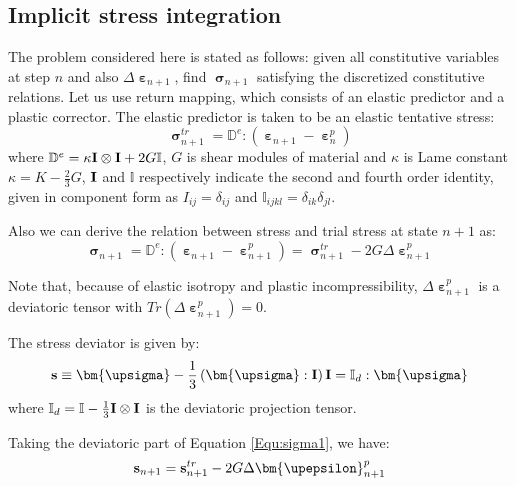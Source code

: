 \subsection{Implicit stress integration}
The problem considered here is stated as follows: given all constitutive variables at step $n$ and also $\Delta {{\bm{\upepsilon }}_{n + 1}}$, find $\bm{\upsigma}_{n+1}$  satisfying the discretized constitutive relations. Let us use return mapping, which consists of an elastic predictor and a plastic corrector. The elastic predictor is taken to be an elastic tentative stress:
\begin{equation}
{\bm{\upsigma }}_{n + 1}^{tr} = {\mathbb{D}^e}:\left( {{{\bm{\upepsilon }}_{n + 1}} - {\bm{\upepsilon }}_n^p} \right)
\end{equation}
where ${\mathbb{D}^e} = \kappa {\bf{I}} \otimes {\bf{I}} + 2G\mathbb{I}$, $G$ is shear modules of material and $\kappa$ is Lame constant $\kappa  = K - \frac{2}{3}G$, ${\bf{I}}$ and $\mathbb{I}$ respectively indicate the second and fourth order identity, given in component form as ${I_{ij}} = {\delta _{ij}}$ and ${\mathbb{I}_{ijkl}} = {\delta _{ik}}{\delta _{jl}}$.

Also we can derive the relation between stress and trial stress at state $n+1$ as:
\begin{equation}
\label{Equ:sigma1}
{{\bm{\upsigma }}_{n + 1}^{} = {\mathbb{D}^e}:\left( {{\bm{\upepsilon }}_{n + 1}^{} - {\bm{\upepsilon }}_{n + 1}^p} \right)} = {\bm{\upsigma }}_{n + 1}^{tr} - 2G\Delta {\bm{\upepsilon }}_{n + 1}^p
\end{equation}

Note that, because of elastic isotropy and plastic incompressibility, $\Delta {\bm{\upepsilon }}_{n + 1}^p$ is a deviatoric tensor with $Tr\left( {\Delta {\bm{\upepsilon }}_{n + 1}^p} \right)=0$.

The stress deviator is given by:
\begin{equation}
{\bf{s}} \equiv {\bm{\upsigma }} - \frac{1}{3}\left( {{\bm{\upsigma }}:{\bf{I}}} \right){\bf{I}} = {\mathbb{I}_d}:{\bm{\upsigma }}
\end{equation}
where ${\mathbb{I}_d} = \mathbb{I} - \frac{1}{3}{\bf{I}} \otimes {\bf{I}}$ is the deviatoric projection tensor.

Taking the deviatoric part of Equation \ref{Equ:sigma1}, we have:
\begin{equation}
{{\bf{s}}_{n + 1}} = {\bf{s}}_{n + 1}^{tr} - 2G\Delta {\bm{\upepsilon }}_{n + 1}^p
\end{equation}

